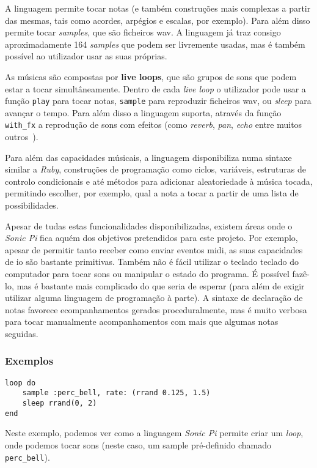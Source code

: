A linguagem permite tocar notas (e também construções mais complexas a partir das mesmas, tais como acordes, arpégios e escalas, por exemplo). Para além disso permite tocar \textit{samples}, que são ficheiros \acrfull{wav}. A linguagem já traz consigo aproximadamente 164 \textit{samples} que podem ser livremente usadas, mas é também possível ao utilizador usar as suas próprias.

As músicas são compostas por \textbf{live loops}, que são grupos de sons que podem estar a tocar simultâneamente. Dentro de cada \textit{live loop} o utilizador pode usar a função \texttt{play} para tocar notas, \texttt{sample} para reproduzir ficheiros \acrshort{wav}, ou \textit{sleep} para avançar o tempo. Para além disso a linguagem suporta, através da função \texttt{with\_fx} a reprodução de sons com efeitos (como \textit{reverb}, \textit{pan}, \textit{echo} entre muitos outros~\cite{sonic-pi-fx}).

Para além das capacidades músicais, a linguagem disponibiliza numa sintaxe similar a \textit{Ruby}, construções de programação como ciclos, variáveis, estruturas de controlo condicionais e até métodos para adicionar aleatoriedade à música tocada, permitindo escolher, por exemplo, qual a nota a tocar a partir de uma lista de possibilidades.

Apesar de tudas estas funcionalidades disponibilizadas, existem áreas onde o \textit{Sonic Pi} fica aquém dos objetivos pretendidos para este projeto. Por exemplo, apesar de permitir tanto receber como enviar eventos \acrshort{midi}, as suas capacidades de \acrfull{io} são bastante primitivas. Também não é fácil utilizar o teclado teclado do computador para tocar sons ou manipular o estado do programa. É possível fazê-lo, mas é bastante mais complicado do que seria de esperar (para além de exigir utilizar alguma linguagem de programação à parte). A sintaxe de declaração de notas favorece ecompanhamentos gerados proceduralmente, mas é muito   verbosa para tocar manualmente acompanhamentos com mais que algumas notas seguidas.

\subsubsection{Exemplos}
\begin{lstlisting}[caption={Reproduzir um \textit{sample} com valores aleatórios}] 
loop do
    sample :perc_bell, rate: (rrand 0.125, 1.5)
    sleep rrand(0, 2)
end
\end{lstlisting}
Neste exemplo, podemos ver como a linguagem \textit{Sonic Pi} permite criar um \textit{loop}, onde podemos tocar sons (neste caso, um sample pré-definido chamado \texttt{perc\_bell}).

